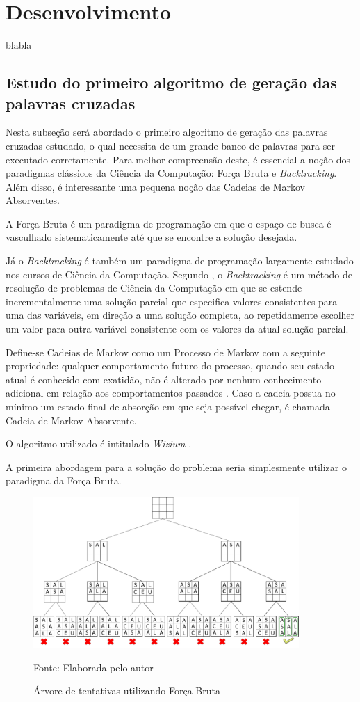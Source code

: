 \section{Desenvolvimento}
blabla

\subsection{Estudo do primeiro algoritmo de geração das palavras cruzadas} 
Nesta subseção será abordado o primeiro algoritmo de geração das palavras cruzadas estudado, o qual necessita de um grande banco de palavras para ser executado corretamente. Para melhor compreensão deste, é essencial a noção dos paradigmas clássicos da Ciência da Computação: Força Bruta e \textit{Backtracking}. Além disso, é interessante uma pequena noção das Cadeias de Markov Absorventes.

A Força Bruta é um paradigma de programação em que o espaço de busca é vasculhado sistematicamente até que se encontre a solução desejada.

Já o \textit{Backtracking} é também um paradigma de programação largamente estudado nos cursos de Ciência da Computação. Segundo \cite{nilsson1980principles}, o \textit{Backtracking} é um método de resolução de problemas de Ciência da Computação em que se estende incrementalmente uma solução parcial que especifica valores consistentes para uma das variáveis, em direção a uma solução completa, ao repetidamente escolher um valor para outra variável consistente com os valores da atual solução parcial.

Define-se Cadeias de Markov como um Processo de Markov com a seguinte propriedade: qualquer comportamento futuro do processo, quando seu estado atual é conhecido com exatidão, não é alterado por nenhum conhecimento adicional em relação aos comportamentos passados \citep{howard1998introduction}. Caso a cadeia possua no mínimo um estado final de absorção em que seja possível chegar, é chamada Cadeia de Markov Absorvente.

O algoritmo utilizado é intitulado \textit{Wizium} \citep{wizium}.

A primeira abordagem para a solução do problema seria simplesmente utilizar o paradigma da Força Bruta.

\begin{figure}[H]
\centering
    \caption{Árvore de tentativas utilizando Força Bruta}
    \label{fig:crossTree}
    \includegraphics[width=0.9\textwidth]{Figuras/crosswordsTree.png}
    
    Fonte: Elaborada pelo autor
\end{figure}

